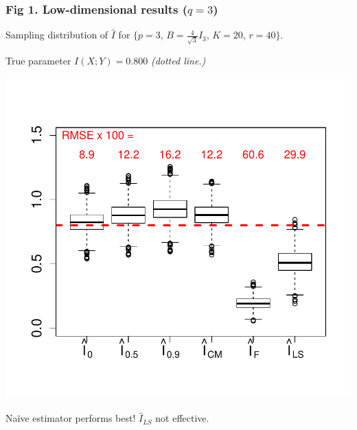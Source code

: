 \documentclass{beamer}
\begin{document}
\begin{frame}
\frametitle{Fig 1. Low-dimensional results ($q = 3$)}
Sampling distribution of $\hat{I}$ for \small{$\{p = 3$, $B = \frac{4}{\sqrt{3}} I_3$, $K = 20$, $r = 40\}$.}

True parameter $I(X; Y) = 0.800$ \emph{(dotted line.)}
\begin{center}
\includegraphics[scale = 0.5, clip = true, trim = 0 0.5in 0 0.5in]{../info_theory_sims/fig1.pdf}
\end{center}
Na\"{i}ve estimator performs best!  $\hat{I}_{LS}$ not effective.
\end{frame}
\end{document}
